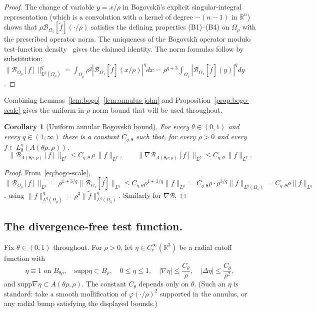 \documentclass[11pt]{amsart}
\newtheorem{corollary}[theorem]{Corollary}
\theoremstyle{definition}
\newcommand{\RR}{\mathbb{R}}
\newcommand{\BB}{\mathcal{B}}    %
\newcommand{\norm}[1]{\|#1\|}
\newcommand{\abs}[1]{|#1|}
\newcommand{\supp}{\mathrm{supp}}
\begin{document}
\begin{proof}
The change of variable $y = x/\rho$ in Bogovski\u{\i}'s explicit
singular-integral representation (which is a convolution with a
kernel of degree $-(n-1)$ in $\RR^n$) shows that $\rho
\BB_{\Omega_1}[\tilde f](\cdot/\rho)$ satisfies the defining
properties (B1)--(B4) on $\Omega_\rho$ with the prescribed
operator norm. The uniqueness of the Bogovski\u{\i} operator
modulo test-function density~\cite[III.3.1]{Galdi} gives the
claimed identity. The norm formulas follow by substitution:
$\norm{\BB_{\Omega_\rho}[f]}_{L^q(\Omega_\rho)}^q =
\int_{\Omega_\rho} \rho^q \abs{\BB_{\Omega_1}[\tilde f](x/\rho)}^q
dx = \rho^{q + 3} \int_{\Omega_1}
\abs{\BB_{\Omega_1}[\tilde f](y)}^q dy$.
\end{proof}

Combining Lemmas~\ref{lem:bogo}--\ref{lem:annulus-john} and
Proposition~\ref{prop:bogo-scale} gives the uniform-in-$\rho$
norm bound that will be used throughout.

\begin{corollary}[Uniform annular Bogovski\u{\i} bound]
\label{cor:bogo-annulus}
For every $\theta \in (0, 1)$ and every $q \in (1, \infty)$ there
is a constant $C_{q,\theta}$ such that, for every $\rho > 0$ and
every $f \in L^q_0(A(\theta\rho, \rho))$,
\begin{equation}\label{eq:bogo-uniform}
\norm{\BB_{A(\theta\rho, \rho)}[f]}_{L^q} \leq C_{q,\theta}\,\rho\,\norm{f}_{L^q},
\qquad
\norm{\nabla \BB_{A(\theta\rho, \rho)}[f]}_{L^q} \leq C_{q,\theta}\,\norm{f}_{L^q}.
\end{equation}
\end{corollary}

\begin{proof}
From~\eqref{eq:bogo-scale},
$\norm{\BB_{\Omega_\rho}[f]}_{L^q} = \rho^{1+3/q}
\norm{\BB_{\Omega_1}[\tilde f]}_{L^q} \leq C_{q,\theta} \rho^{1+3/q}
\norm{\tilde f}_{L^q} = C_{q,\theta}\rho \cdot \rho^{3/q}
\norm{\tilde f}_{L^q(\Omega_1)} = C_{q,\theta}\rho \norm{f}_{L^q}$,
using $\norm{f}^q_{L^q(\Omega_\rho)} = \rho^3 \norm{\tilde f}^q_{L^q(\Omega_1)}$.
Similarly for $\nabla \BB$.
\end{proof}

\subsection{The divergence-free test function.}

Fix $\theta \in (0, 1)$ throughout. For $\rho > 0$, let
$\eta \in C^\infty_c(\RR^3)$ be a radial cutoff function with
\begin{equation}\label{eq:cutoff}
\eta \equiv 1 \text{ on } B_{\theta\rho}, \quad
\supp \eta \subset B_\rho, \quad
0 \leq \eta \leq 1, \quad
\abs{\nabla \eta} \leq \frac{C_\theta}{\rho}, \quad
\abs{\Delta \eta} \leq \frac{C_\theta}{\rho^2},
\end{equation}
and $\supp \nabla \eta \subset A(\theta\rho, \rho)$. The constant
$C_\theta$ depends only on $\theta$. (Such an $\eta$ is standard:
take a smooth mollification of $\varphi(\cdot/\rho)^2$ supported in
the annulus, or any radial bump satisfying the displayed bounds.)
\end{document}
